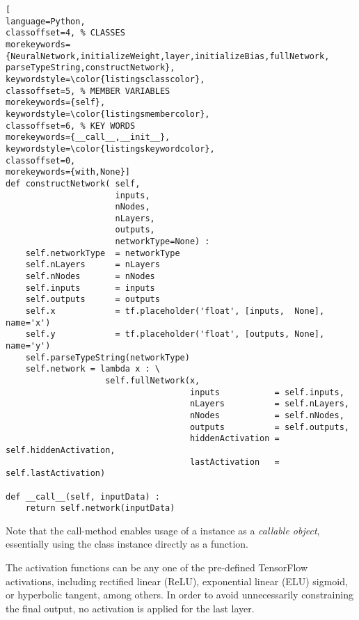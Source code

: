 \documentclass[../../master.tex]{subfiles}
\begin{document}
\begin{lstlisting}[
language=Python,
classoffset=4, % CLASSES
morekeywords={NeuralNetwork,initializeWeight,layer,initializeBias,fullNetwork, parseTypeString,constructNetwork},
keywordstyle=\color{listingsclasscolor},
classoffset=5, % MEMBER VARIABLES
morekeywords={self},
keywordstyle=\color{listingsmembercolor},
classoffset=6, % KEY WORDS
morekeywords={__call__,__init__},
keywordstyle=\color{listingskeywordcolor},
classoffset=0,
morekeywords={with,None}]
def constructNetwork( self, 
                      inputs, 
                      nNodes, 
                      nLayers, 
                      outputs, 
                      networkType=None) :
    self.networkType  = networkType
    self.nLayers      = nLayers
    self.nNodes       = nNodes
    self.inputs       = inputs
    self.outputs      = outputs
    self.x            = tf.placeholder('float', [inputs,  None], name='x')
    self.y            = tf.placeholder('float', [outputs, None], name='y')
    self.parseTypeString(networkType)
    self.network = lambda x : \
                    self.fullNetwork(x,
                                     inputs           = self.inputs,
                                     nLayers          = self.nLayers,
                                     nNodes           = self.nNodes,
                                     outputs          = self.outputs,
                                     hiddenActivation = self.hiddenActivation,
                                     lastActivation   = self.lastActivation) 

def __call__(self, inputData) :
    return self.network(inputData)
\end{lstlisting}
Note that the call-method enables usage of a  instance as a \emph{callable object}, essentially using the class instance directly as a function. 

The activation functions can be any one of the pre-defined TensorFlow activations, including rectified linear (ReLU), exponential linear (ELU) sigmoid, or hyperbolic tangent, among others. In order to avoid unnecessarily constraining the final output, no activation is applied for the last layer. 
\end{document}
